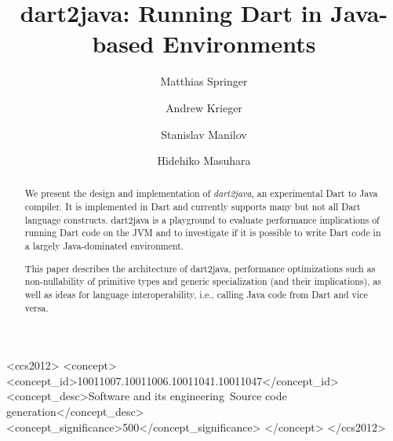 \documentclass[sigplan]{acmart}
\begin{document}
\title{{dart2java}: Running Dart in Java-based Environments}

\newcommand\Mark[1]{\textsuperscript#1}


\author[M. Springer]{Matthias Springer}

\author[A. Krieger]{Andrew Krieger}

\author[S. Manilov]{Stanislav Manilov}

\author[H. Masuhara]{Hidehiko Masuhara}



\setlength{\belowcaptionskip}{-5pt}

\begin{abstract}
We present the design and implementation of \emph{dart2java}, an experimental Dart to Java compiler. It is implemented in Dart and currently supports many but not all Dart language constructs. dart2java is a playground to evaluate performance implications of running Dart code on the JVM and to investigate if it is possible to write Dart code in a largely Java-dominated environment.

This paper describes the architecture of dart2java, performance optimizations such as non-nullability of primitive types and generic specialization (and their implications), as well as ideas for language interoperability, i.e., calling Java code from Dart and vice versa.
\end{abstract}

\begin{CCSXML}
<ccs2012>
<concept>
<concept_id>10011007.10011006.10011041.10011047</concept_id>
<concept_desc>Software and its engineering~Source code generation</concept_desc>
<concept_significance>500</concept_significance>
</concept>
</ccs2012>
\end{CCSXML}
\end{document}
